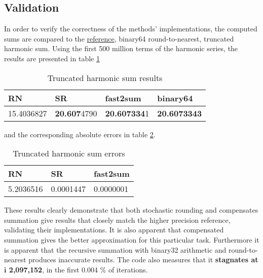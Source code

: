 \documentclass[a4paper]{article} %
\begin{document}
\begin{multicols}{2}
\subsection{Validation}
In order to verify the correctness of the methods' implementations, the computed sums are compared to the \hyperref[part2:4]{reference}, binary64 round-to-nearest, truncated harmonic sum. Using the first 500 million terms of the harmonic series, the results are presented in table \ref{table:3}

\begin{table}[H]
\small
\centering
\begin{tabular}{ |p{1.5cm}|p{1.5cm}|p{1.5cm}|p{1.5cm}| }
 \hline
 RN & SR & fast2sum & \textbf{binary64} \\
 \hline
 15.4036827 & \textbf{20.607}4790 & \textbf{20.607334}1 & \textbf{20.6073343} \\
 \hline
\end{tabular}
\caption{Truncated harmonic sum results}
\label{table:3}
\end{table}

and the corresponding absolute errors in table \ref{table:4}.
\begin{table}[H]
\centering
\begin{tabular}{ |p{1.7cm}|p{1.7cm}|p{1.7cm}| }
 \hline
 RN & SR & fast2sum \\
 \hline
 5.2036516 & 0.0001447 & 0.0000001\\
 \hline
\end{tabular}
\caption{Truncated harmonic sum errors}
\label{table:4}
\end{table}
These results clearly demonstrate that both stochastic rounding and compensates summation give results that closely match the higher precision reference, validating their implementations. It is also apparent that compensated summation gives the better approximation for this particular task. Furthermore it is apparent that the recursive summation with binary32 arithmetic and round-to-nearest produces inaccurate results. The code also measures that it \textbf{stagnates at $\pmb{i}$ 2,097,152}, in the first 0.004 \%  of iterations.



\end{multicols}
\end{document}
